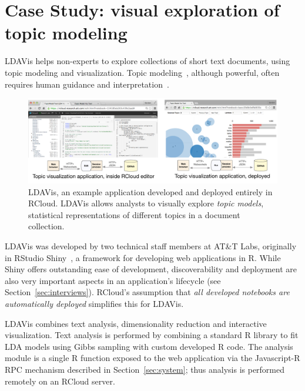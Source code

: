 \section{Case Study\label{sec:casestudy}: visual exploration of topic modeling}

LDAVis helps non-experts to explore collections of
short text documents, using topic modeling and
visualization. Topic modeling~\cite{Blei:2003:LDA},
although powerful, often requires human guidance
and interpretation~\cite{Sievert:2014:LAM}.

\begin{figure}
  \vspace{-1.5em}
  \includegraphics[width=\linewidth]{fig/casestudytext/casestudytext.pdf}
  \vspace{-3.0em}
  \caption{\label{fig:textvis}LDAVis, an example application developed
    and deployed entirely in RCloud.  LDAVis allows analysts to
    visually explore \emph{topic models}, statistical
    representations of different topics in a document collection.
  }\vspace{-1.5em}
\end{figure}

LDAVis was developed by two technical staff members at
AT\&T Labs, originally in RStudio Shiny~\cite{RStudio:2013:SWA},
a framework for developing web applications in R.
While Shiny offers outstanding ease of development,
discoverability and deployment are also very important aspects
in an application's lifecycle (see Section~\ref{sec:interviews}).
RCloud's assumption that \emph{all developed notebooks are automatically
deployed} simplifies this for LDAVis.

LDAVis combines text analysis, dimensionality reduction and
interactive visualization. Text analysis is performed by
combining a standard R library to fit LDA models using
Gibbs sampling with custom developed R code.
The analysis module is a single R function
exposed to the web application via the Javascript-R RPC
mechanism described in Section~\ref{sec:system};
thus analysis is performed remotely on an RCloud server.


